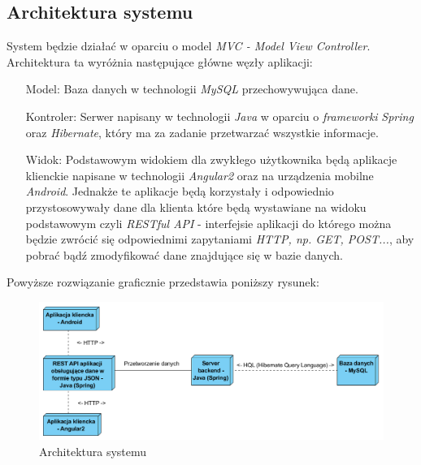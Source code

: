 \documentclass[10pt,titlepage]{article} %
\begin{document}
\subsection{Architektura systemu}
System będzie działać w oparciu o model \textit{MVC - Model View Controller}\cite{mvc}.
Architektura ta wyróżnia następujące główne węzły aplikacji:
\begin{enumerate}
\item[Model:] Baza danych w technologii \textit{MySQL} przechowywująca dane.
\item[Kontroler:] Serwer napisany w technologii \textit{Java} w oparciu o \textit{frameworki} \textit{Spring} oraz \textit{Hibernate}, który ma za zadanie przetwarzać wszystkie informacje.
\item[Widok:] Podstawowym widokiem dla zwykłego użytkownika będą aplikacje klienckie napisane w technologii \textit{Angular2} oraz na urządzenia mobilne \textit{Android}. Jednakże te aplikacje będą korzystały i odpowiednio przystosowywały dane dla klienta które będą wystawiane na widoku podstawowym czyli \textit{RESTful API} - interfejsie aplikacji do którego można będzie zwrócić się odpowiednimi zapytaniami \textit{HTTP, np. GET, POST...}, aby pobrać bądź zmodyfikować dane znajdujące się w bazie danych.
\end{enumerate}

Powyższe rozwiązanie graficznie przedstawia poniższy rysunek:
\begin{figure}[H]
\includegraphics[width=\textwidth]{img/sekcja2/architekturaAplikacji}
\caption[Architektura systemu]{Architektura systemu}
\end{figure}
\end{document}
